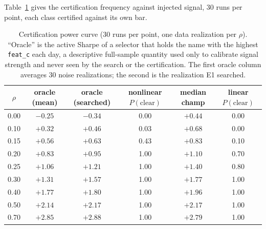 \documentclass[11pt]{article}
\newcommand{\code}[1]{\texttt{#1}}
\begin{document}
Table~\ref{tab:power} gives the certification frequency against injected signal, 30 runs per point,
each class certified against its own bar.

\begin{table}[htbp]
\centering
\caption{Certification power curve (30 runs per point, one data realization per $\rho$). ``Oracle''
is the active Sharpe of a selector that holds the name with the highest \code{feat\_c} each day, a
descriptive full-sample quantity used only to calibrate signal strength and never seen by the search or
the certification. The first oracle column averages 30 noise realizations; the second is the
realization E1 searched.}
\label{tab:power}
\small
\begin{tabular}{c c c c c c}
\toprule
$\rho$ & oracle (mean) & oracle (searched) & nonlinear $P(\text{clear})$ & median champ & linear $P(\text{clear})$ \\
\midrule
0.00 & $-0.25$ & $-0.34$ & 0.00 & $+0.44$ & 0.00 \\
0.10 & $+0.32$ & $+0.46$ & 0.03 & $+0.68$ & 0.00 \\
0.15 & $+0.56$ & $+0.63$ & 0.43 & $+0.83$ & 0.10 \\
0.20 & $+0.83$ & $+0.95$ & 1.00 & $+1.10$ & 0.70 \\
0.25 & $+1.06$ & $+1.21$ & 1.00 & $+1.40$ & 0.80 \\
0.30 & $+1.31$ & $+1.57$ & 1.00 & $+1.77$ & 1.00 \\
0.40 & $+1.77$ & $+1.80$ & 1.00 & $+1.96$ & 1.00 \\
0.50 & $+2.14$ & $+2.17$ & 1.00 & $+2.17$ & 1.00 \\
0.70 & $+2.85$ & $+2.88$ & 1.00 & $+2.79$ & 1.00 \\
\bottomrule
\end{tabular}
\end{table}
\end{document}
